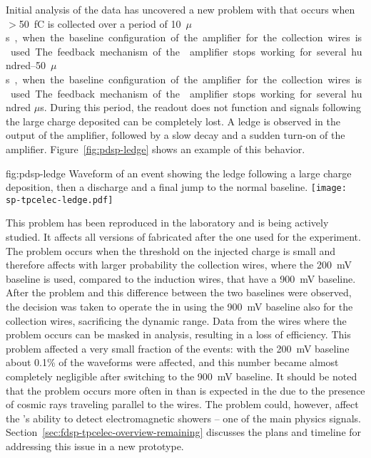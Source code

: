 Initial analysis of the  data has uncovered a new problem with  
that occurs when $>$\SI{50}{fC} is collected over a period of \SIrange{10}{50}{$\mu$s}, 
when the baseline configuration of the amplifier for the collection wires is used. 
The feedback mechanism of the  amplifier stops working for several 
hundred $\mu$s. During this period, the readout does not function and signals 
following the large charge deposited can be completely lost. A ledge is observed 
in the output of the  amplifier, followed by a slow decay 
and a sudden turn-on of the amplifier.
Figure~\ref{fig:pdsp-ledge} shows an example of this behavior.

\begin{dunefigure}
{fig:pdsp-ledge}
{Waveform of an event showing the ledge following a large charge 
deposition, then a discharge and a final jump to the normal baseline.}
\texttt{[image: sp-tpcelec-ledge.pdf]}
\end{dunefigure}

This problem has been reproduced in the laboratory and is being actively 
studied. It affects all versions of  fabricated after 
the one used for the  experiment. The problem occurs 
when the threshold on the injected charge is small and therefore affects
with larger probability the collection wires, where the \SI{200}{mV} baseline 
is used, compared to the induction wires, that have a \SI{900}{mV} baseline.
After the problem and this difference between the two baselines were 
observed, the decision was taken to operate the  in  
using the \SI{900}{mV} baseline also for the collection wires, sacrificing
the dynamic range. Data from the wires where the problem occurs can
be masked in analysis, resulting in a loss of efficiency. This problem 
affected a very small fraction of the events: with the \SI{200}{mV}
baseline about \num{0.1}\% of the waveforms were affected, and this
number became almost completely negligible after switching to the 
\SI{900}{mV} baseline. It should be
noted that the problem occurs more often in  
than is expected in the    due to the presence of 
cosmic rays traveling parallel to the  wires.
The problem could, however, affect the 's ability to detect
electromagnetic showers -- one of the main physics signals.
Section~\ref{sec:fdsp-tpcelec-overview-remaining} discusses the plans and timeline 
for addressing this issue in a new  prototype.

